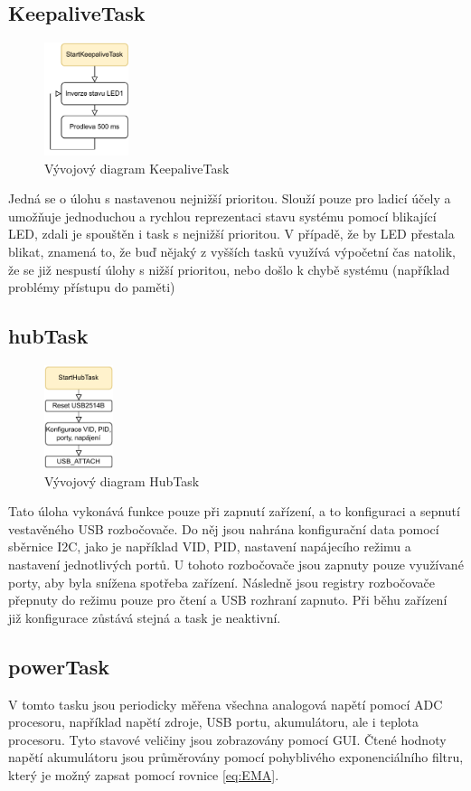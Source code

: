 \subsection{KeepaliveTask}
\begin{figure}[h]
    \centering
    \includegraphics[width=0.22\textwidth]{obrazky/KeepaliveTask}
    \caption{Vývojový diagram KeepaliveTask}
\end{figure}
Jedná se o úlohu s nastavenou nejnižší prioritou. Slouží pouze pro ladicí účely a umožňuje jednoduchou a rychlou reprezentaci stavu systému pomocí blikající LED, zdali je spouštěn i task s nejnižší prioritou. V případě, že by LED přestala blikat, znamená to, že buď nějaký z vyšších tasků využívá výpočetní čas natolik, že se již nespustí úlohy s nižší prioritou, nebo došlo k chybě systému (například problémy přístupu do paměti)
\subsection{hubTask}
\begin{figure}[h]
    \centering
    \includegraphics[width=0.18\textwidth]{obrazky/HubTask}
    \caption{Vývojový diagram HubTask}
\end{figure}
Tato úloha vykonává funkce pouze při zapnutí zařízení, a to konfiguraci a sepnutí vestavěného \ac{USB} rozbočovače. Do něj jsou nahrána konfigurační data pomocí sběrnice I2C, jako je například \ac{VID}, \ac{PID}, nastavení napájecího režimu a nastavení jednotlivých portů. U tohoto rozbočovače jsou zapnuty pouze využívané porty, aby byla snížena spotřeba zařízení. Následně jsou registry rozbočovače přepnuty do režimu pouze pro čtení a \ac{USB} rozhraní zapnuto. Při běhu zařízení již konfigurace zůstává stejná a task je neaktivní.
\subsection{powerTask}
V tomto tasku jsou periodicky měřena všechna analogová napětí pomocí \ac{ADC} procesoru, například napětí zdroje, USB portu, akumulátoru, ale i teplota procesoru. Tyto stavové veličiny jsou zobrazovány pomocí \ac{GUI}. Čtené hodnoty napětí akumulátoru jsou průměrovány pomocí pohyblivého exponenciálního filtru, který je možný zapsat pomocí rovnice \ref{eq:EMA}.

